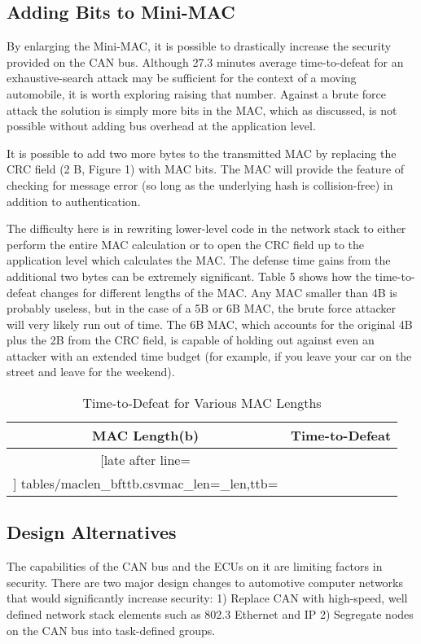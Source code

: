 \subsection{Adding Bits to Mini-MAC}
By enlarging the Mini-MAC, it is possible to drastically increase the security provided on the CAN bus. Although 27.3 minutes average time-to-defeat for an exhaustive-search attack may be sufficient for the context of a moving automobile, it is worth exploring raising that number. Against a brute force attack the solution is simply more bits in the MAC, which as discussed, is not possible without adding bus overhead at the application level. 

It is possible to add two more bytes to the transmitted MAC by replacing the CRC field (2 B, Figure 1) with MAC bits. The MAC will provide the feature of checking for message error (so long as the underlying hash is collision-free) in addition to authentication.
	
The difficulty here is in rewriting lower-level code in the network stack to either perform the entire MAC calculation or to open the CRC field up to the application level which calculates the MAC. The defense time gains from the additional two bytes can be extremely significant. Table 5 shows how the time-to-defeat changes for different lengths of the MAC. Any MAC smaller than 4B is probably useless, but in the case of a 5B or 6B MAC, the brute force attacker will very likely run out of time. The 6B MAC, which accounts for the original 4B plus the 2B from the CRC field, is capable of holding out against even an attacker with an extended time budget (for example, if you leave your car on the street and leave for the weekend).

	\begin{table}	
	\centering
	\caption{Time-to-Defeat for Various MAC Lengths}
	\vspace{8pt}
	\begin{tabular}{|c|r|}\hline%
	\bfseries MAC Length(b) & \bfseries Time-to-Defeat\\\hline \csvreader[late after line=\\]%
		{tables/maclen_bfttb.csv}{mac_len=\mac_len,ttb=\ttb}%
		{\mac_len & \ttb}%
		\hline
	\end{tabular}
	\end{table}

\subsection{Design Alternatives}
The capabilities of the CAN bus and the ECUs on it are limiting factors in security. There are two major design changes to automotive computer networks that would significantly increase security: 1) Replace CAN with high-speed, well defined network stack elements such as 802.3 Ethernet and IP 2) Segregate nodes on the CAN bus into task-defined groups.

